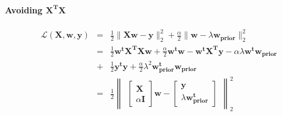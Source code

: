 \documentclass[12pt]{article}
\newcommand{\B}[1]{\mathbf{#1}}
\begin{document}
\paragraph{Avoiding $\B{X^TX}$}
\begin{eqnarray*}
	\mathcal{L}(\B{X, w, y}) & = & \frac{1}{2} \| \B{Xw - y} \|_2^2 + \frac{\alpha}{2} \|\B w - \lambda \B{ w_{prior}}\|_2^2 \\
& = & \frac{1}{2}\B{w^tX^TXw} + \frac{\alpha}{2} \B{w^tw} - \B{w^tX^Ty} - \alpha \lambda \B{w^tw_{prior}} \\
 & + & \frac{1}{2}\B{y^ty} + \frac{\alpha}{2} \lambda^2 \B{w_{prior}^tw_{prior}} \\
& = & \frac{1}{2}
\begin{Vmatrix}
\begin{bmatrix} \B X\\ \alpha \B I \end{bmatrix} \B w - \begin{bmatrix} \B y \\ \lambda \B{w_{prior}^t} \end{bmatrix}
\end{Vmatrix}_2^2 
\end{eqnarray*}


\end{document}
